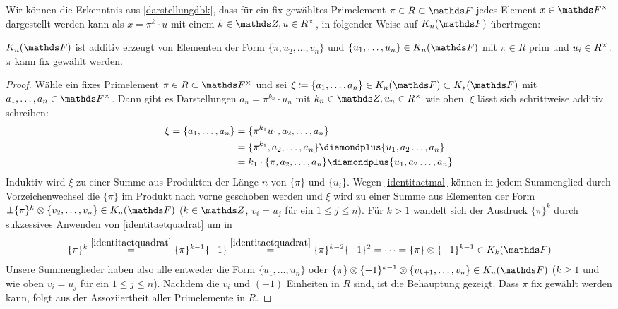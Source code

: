 \documentclass[ngerman,fontsize=11pt, paper=a4, parskip=half, titlepage=true, toc=bib]{scrartcl}
\begin{document}
Wir können die Erkenntnis aus \ref{darstellungdbk},
dass für ein fix gewähltes Primelement $\pi\in R\subset \F$
jedes Element $x\in\Fx$ dargestellt werden kann als 
$x=\pi^k\cdot u$ mit einem $k\in\Z, u\in \Rx$,
in folgender Weise auf $\KnF$ übertragen:

\begin{Lem}\label{darstellungknf}
  $\KnF$ ist additiv erzeugt von Elementen der Form 
  $\{\pi, u_{2},\dotsc,v_n\}$
  und $\{u_{1},\dotsc,u_n\}\in\KnF$ mit $\pi\in R$ prim und
  $u_i\in R^\times$.
  $\pi$ kann fix gewählt werden.
  \begin{proof}
    Wähle ein fixes Primelement $\pi\in R\subset\Fx$
    und sei $\xi\coloneqq\{a_1,\dotsc, a_n\}\in\KnF\subset\KF$ mit
    $a_1,\dotsc,a_n\in\Fx$. Dann gibt es Darstellungen
    $a_n=\pi^{k_n}\cdot u_n$ mit $k_n\in\Z,u_n\in \Rx$ wie
    oben. $\xi$ lässt sich schrittweise additiv schreiben:
    \begin{align*}
      \xi=\{a_1,\dotsc,a_n\}
      &=\{\pi^{k_1}u_1, a_2, \dotsc, a_n\}\\
      &=\{\pi^{k_1}, a_2, \dotsc, a_n\}
        \p\{u_1, a_2 \dotsc, a_n\}\\
      &=k_1\cdot \{\pi,a_2, \dotsc, a_n\}
        \p\{u_1, a_2 \dotsc, a_n\}
    \end{align*}
    Induktiv wird $\xi$ zu einer Summe aus Produkten der Länge $n$ von
    $\{\pi\}$ und $\{u_i\}$.
    Wegen \ref{identitaetmal} können in jedem Summenglied durch
    Vorzeichenwechsel die $\{\pi\}$ im Produkt nach vorne geschoben werden
    und $\xi$ wird zu einer Summe aus Elementen der Form
    $\pm\{\pi\}^k\otimes\{v_{2},\dotsc,v_n\}\in\KnF$ 
    ($k\in\Z$, $v_i=u_j$ für ein $1\leq j\leq n$).
    Für $k>1$ wandelt sich der Ausdruck $\{\pi\}^k$ durch
    sukzessives Anwenden von \ref{identitaetquadrat} um in
    \begin{gather*}
      \{\pi\}^k
      \overset{\ref{identitaetquadrat}}{=} \{\pi\}^{k-1}\{-1\}
      \overset{\ref{identitaetquadrat}}{=} \{\pi\}^{k-2}\{-1\}^2
      =\dotsb=\{\pi\}\otimes\{-1\}^{k-1} \in\K_{k}(\F)
    \end{gather*}
    Unsere Summenglieder haben also alle entweder die Form 
    $\{u_1,\dotsc, u_n\}$ oder
    $\{\pi\}\otimes\{-1\}^{k-1}\otimes\{v_{k+1},\dotsc,v_n\}\in\KnF$
    ($k\geq 1$ und wie oben $v_i=u_j$ für ein $1\leq j\leq n$).
    Nachdem die $v_i$ und $(-1)$ Einheiten in $R$ sind,
    ist die Behauptung gezeigt.
    Dass $\pi$ fix gewählt werden kann, folgt aus der Assoziiertheit
    aller Primelemente in $R$.
  \end{proof}
\end{Lem}
\end{document}

